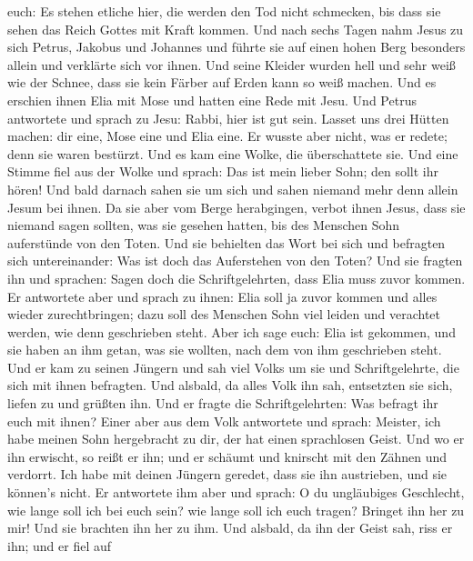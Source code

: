 euch: Es stehen etliche hier, die werden den Tod nicht schmecken, bis
dass sie sehen das Reich Gottes mit Kraft kommen.  Und nach
sechs Tagen nahm Jesus zu sich Petrus, Jakobus und Johannes und führte
sie auf einen hohen Berg besonders allein und verklärte sich vor ihnen.
 Und seine Kleider wurden hell und sehr weiß wie der Schnee,
dass sie kein Färber auf Erden kann so weiß machen.  Und es
erschien ihnen Elia mit Mose und hatten eine Rede mit Jesu. 
Und Petrus antwortete und sprach zu Jesu: Rabbi, hier ist gut sein.
Lasset uns drei Hütten machen: dir eine, Mose eine und Elia eine.
 Er wusste aber nicht, was er redete; denn sie waren
bestürzt.  Und es kam eine Wolke, die überschattete sie. Und
eine Stimme fiel aus der Wolke und sprach: Das ist mein lieber Sohn; den
sollt ihr hören!  Und bald darnach sahen sie um sich und
sahen niemand mehr denn allein Jesum bei ihnen.  Da sie aber
vom Berge herabgingen, verbot ihnen Jesus, dass sie niemand sagen
sollten, was sie gesehen hatten, bis des Menschen Sohn auferstünde von
den Toten.  Und sie behielten das Wort bei sich und
befragten sich untereinander: Was ist doch das Auferstehen von den
Toten?  Und sie fragten ihn und sprachen: Sagen doch die
Schriftgelehrten, dass Elia muss zuvor kommen.  Er
antwortete aber und sprach zu ihnen: Elia soll ja zuvor kommen und alles
wieder zurechtbringen; dazu soll des Menschen Sohn viel leiden und
verachtet werden, wie denn geschrieben steht.  Aber ich
sage euch: Elia ist gekommen, und sie haben an ihm getan, was sie
wollten, nach dem von ihm geschrieben steht.  Und er kam zu
seinen Jüngern und sah viel Volks um sie und Schriftgelehrte, die sich
mit ihnen befragten.  Und alsbald, da alles Volk ihn sah,
entsetzten sie sich, liefen zu und grüßten ihn.  Und er
fragte die Schriftgelehrten: Was befragt ihr euch mit ihnen?
 Einer aber aus dem Volk antwortete und sprach: Meister,
ich habe meinen Sohn hergebracht zu dir, der hat einen sprachlosen
Geist.  Und wo er ihn erwischt, so reißt er ihn; und er
schäumt und knirscht mit den Zähnen und verdorrt. Ich habe mit deinen
Jüngern geredet, dass sie ihn austrieben, und sie können's nicht.
 Er antwortete ihm aber und sprach: O du ungläubiges
Geschlecht, wie lange soll ich bei euch sein? wie lange soll ich euch
tragen? Bringet ihn her zu mir!  Und sie brachten ihn her
zu ihm. Und alsbald, da ihn der Geist sah, riss er ihn; und er fiel auf
